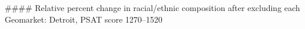 #### Relative percent change in racial/ethnic composition after excluding each Geomarket: Detroit, PSAT score 1270–1520
